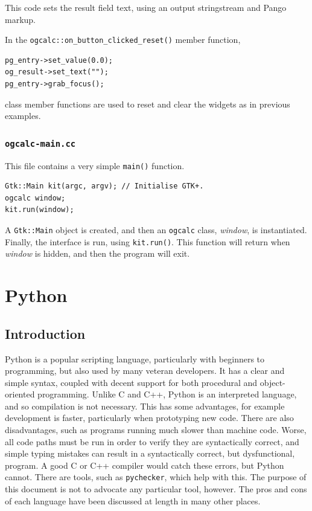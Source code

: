 \documentclass[a4paper,oneside]{article}
\newcommand{\filename}[1]{\texttt{#1}}
\newcommand{\program}[1]{\texttt{#1}}
\newcommand{\variable}[1]{\textsl{#1}}
\newcommand{\class}[1]{\texttt{#1}}
\newcommand{\function}[1]{\texttt{#1()}}
\newcommand{\code}[1]{\texttt{#1}}
\begin{document}
This code sets the result field text, using an output stringstream and
Pango markup.

In the \function{ogcalc::on\_button\_clicked\_reset} member function,

\begin{lstlisting}[numbers=none, language={[GNU]C++}]
pg_entry->set_value(0.0);
og_result->set_text("");
pg_entry->grab_focus();
\end{lstlisting}

\noindent class member functions are used to reset and clear the
widgets as in previous examples.

\subsubsection{\filename{ogcalc-main.cc}}

This file contains a very simple \function{main} function.

\begin{lstlisting}[numbers=none, language={[GNU]C++}]
Gtk::Main kit(argc, argv); // Initialise GTK+.
ogcalc window;
kit.run(window);
\end{lstlisting}

A \class{Gtk::Main} object is created, and then an \class{ogcalc}
class, \variable{window}, is instantiated.  Finally, the interface is
run, using \code{kit.run()}.  This function will return when
\variable{window} is hidden, and then the program will exit.

\section{Python}

\label{sec:python}

\subsection{Introduction}

Python is a popular scripting language, particularly with beginners to
programming, but also used by many veteran developers.  It has a clear
and simple syntax, coupled with decent support for both procedural and
object-oriented programming.  Unlike C and C++, Python is an
interpreted language, and so compilation is not necessary.  This has
some advantages, for example development is faster, particularly when
prototyping new code.  There are also disadvantages, such as programs
running much slower than machine code.  Worse, all code paths must be
run in order to verify they are syntactically correct, and simple
typing mistakes can result in a syntactically correct, but
dysfunctional, program.  A good C or C++ compiler would catch these
errors, but Python cannot.  There are tools, such as
\program{pychecker}, which help with this.  The purpose of this
document is not to advocate any particular tool, however.  The pros
and cons of each language have been discussed at length in many other
places.
\end{document}
